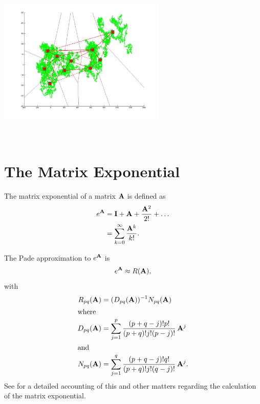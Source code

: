 \includegraphics[width=8.0cm,height=8.0cm]{Figures/ClusteringRW/rw_1000000_delauney_kmens_convex_hull_voroni_onKM.jpg}



\section{The Matrix Exponential}
The matrix exponential of a matrix $\mathbf{A}$ is defined as
\begin{align*}
  e^{\mathbf{A}}
  &= \mathbf{I} + \mathbf{A} + \frac{\mathbf{A}^2}{2!} + \dots \\
  &= \sum_{k = 0}^\infty \frac{\mathbf{A}^k}{k!}.
\end{align*}

The Pade approximation to
$e^{\mathbf{A}}$ is
\begin{displaymath}
  e^{\mathbf{A}} \approx R(\mathbf{A}),
\end{displaymath}
with
\begin{align*}
  R_{pq} (\mathbf{A})
  &= (D_{pq}(\mathbf{A}))^{-1} N_{pq}(\mathbf{A}) \\
  \intertext{where}
  D_{pq}(\mathbf{A})
  &= \sum_{j=1}^p \frac{(p+q-j)! p!}{ (p+q)!j!(p-j)!}\, \mathbf{A}^j \\
  \intertext{and}
  N_{pq}(\mathbf{A})
  &= \sum_{j=1}^q \frac{(p+q-j)! q!}{ (p+q)!j!(q-j)!}\, \mathbf{A}^j.
\end{align*}
See \cite{Moler78nineteendubious} for a detailed accounting of this and other matters regarding the calculation of the matrix exponential.
